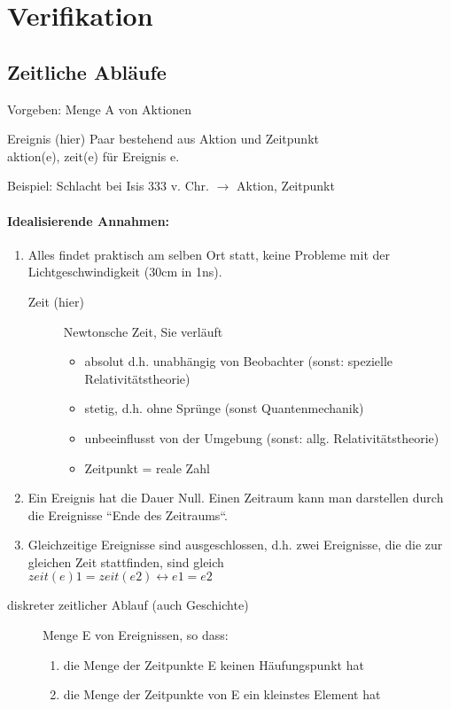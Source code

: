 \chapter{Verifikation}

\section{Zeitliche Abläufe}
Vorgeben: Menge A von Aktionen
\begin{description}
\item {Ereignis (hier)} Paar bestehend aus Aktion und Zeitpunkt\\aktion(e), zeit(e) für Ereignis e.
\end{description}
Beispiel: Schlacht bei Isis 333 v. Chr. $\rightarrow$ Aktion, Zeitpunkt
\subsubsection*{Idealisierende Annahmen:}
\begin{enumerate}
\item Alles findet praktisch am selben Ort statt, keine Probleme mit der Lichtgeschwindigkeit (30cm in 1ns).
	\begin{description}
	\item[Zeit (hier)] Newtonsche Zeit, Sie verläuft
		\begin{itemize}
		\item absolut d.h. unabhängig von Beobachter (sonst: spezielle Relativitätstheorie)
		\item stetig, d.h. ohne Sprünge (sonst Quantenmechanik)
		\item unbeeinflusst von der Umgebung (sonst: allg. Relativitätstheorie)
		\item Zeitpunkt = reale Zahl
		\end{itemize}
	\end{description}
\item Ein Ereignis hat die Dauer Null. Einen Zeitraum kann man darstellen durch die Ereignisse “Ende des Zeitraums“.
\item Gleichzeitige Ereignisse sind ausgeschlossen, d.h. zwei Ereignisse, die die zur gleichen Zeit stattfinden, sind gleich\\
$zeit(e)1 = zeit(e2) \leftrightarrow e1 = e2 $
\end{enumerate}

\begin{description}
	\item[diskreter zeitlicher Ablauf (auch Geschichte)] Menge E von Ereignissen, so dass:
	\begin{enumerate}
		\item die Menge der Zeitpunkte E keinen Häufungspunkt hat
		\item die Menge der Zeitpunkte von E ein kleinstes Element hat
	\end{enumerate}
\end{description}

